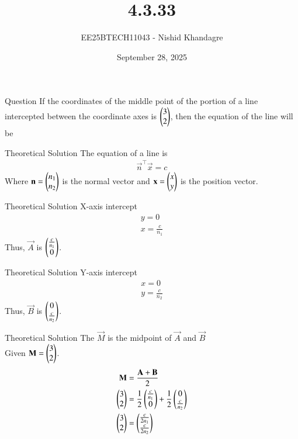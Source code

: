 \documentclass{beamer}
\title
{4.3.33}
\date{September 28, 2025}
\author
{EE25BTECH11043 - Nishid Khandagre}
\begin{document}
\frame{\titlepage}

\begin{frame}{Question}
If the coordinates of the middle point of the portion of a line intercepted between the coordinate axes is $\begin{pmatrix}3\\2\end{pmatrix}$, then the equation of the line will be
\end{frame}

\begin{frame}{Theoretical Solution}
The equation of a line is
\begin{align}
\vec{n}^\top\vec{x} = c
\end{align}
Where $\mathbf{n} = \begin{pmatrix}n_1 \\ n_2\end{pmatrix}$ is the normal vector and $\mathbf{x} = \begin{pmatrix}x \\ y\end{pmatrix}$ is the position vector.
\end{frame}

\begin{frame}{Theoretical Solution}
X-axis intercept
\begin{align}
 y=0\\
x = \frac{c}{n_1}
\end{align}
Thus, $\vec{A}$ is $\begin{pmatrix}\frac{c}{n_1} \\ 0\end{pmatrix}$.
\end{frame}

\begin{frame}{Theoretical Solution}
Y-axis intercept
\begin{align}
x=0\\
y = \frac{c}{n_2}
\end{align}
Thus, $\vec{B}$ is $\begin{pmatrix}0 \\ \frac{c}{n_2}\end{pmatrix}$.
\end{frame}

\begin{frame}{Theoretical Solution}
The $\vec{M}$ is the midpoint of $\vec{A}$ and $\vec{B}$\\
Given $\mathbf{M} = \begin{pmatrix}3 \\ 2\end{pmatrix}$.
\begin{align}
\mathbf{M} &= \frac{\mathbf{A} + \mathbf{B}}{2} \\
\begin{pmatrix}3\\2\end{pmatrix}&= \frac{1}{2} \begin{pmatrix}\frac{c}{n_1} \\ 0\end{pmatrix} + \frac{1}{2}\begin{pmatrix}0 \\ \frac{c}{n_2}\end{pmatrix}\\
\begin{pmatrix}3\\2\end{pmatrix}&= \begin{pmatrix}\frac{c}{2n_1} \\ \frac{c}{2n_2}\end{pmatrix}
\end{align}
\end{frame}
\end{document}
